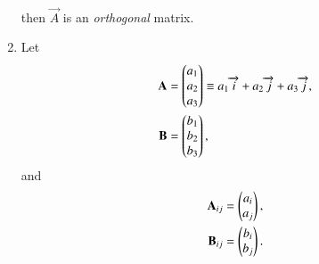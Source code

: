 \begin{enumerate}[label=\thesubsection.\arabic*.,ref=\thesubsection.\theenumi]
\begin{align}
\end{align}
		then $	\vec{A}$ is an {\em orthogonal} matrix.
\item Let 
\begin{align}
  \mathbf{A} &= \begin{pmatrix}a_1\\a_2 \\ a_3\end{pmatrix} \equiv a_1\overrightarrow{i}+a_2\overrightarrow{j}+a_3\overrightarrow{j}, 
  \\
  \mathbf{B} &= \begin{pmatrix}b_1\\b_2 \\ b_3\end{pmatrix}, 
\end{align}
and 
\begin{align}
  \label{eq:cross3d-submat}
\begin{split}
  \mathbf{A}_{ij} &= \begin{pmatrix}a_i\\a_j\end{pmatrix}, 
  \\
  \mathbf{B}_{ij} &= \begin{pmatrix}b_i\\b_j\end{pmatrix}. 
\end{split}
\end{align}


\end{enumerate}
